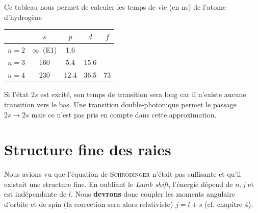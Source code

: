 Ce tableau nous permet de calculer les temps de vie (en ns) de l'atome d'hydrogène
\begin{center}
\begin{tabular}{lcccc}
    & $s$   &   $p$   &   $d$    &  $f$ \\
\hline
$n=2$ & $\infty$~(E1)& 1.6 &   &  \\
$n=3$ & 160  &  5.4  &  15.6 &    \\
$n=4$ & 230  &  12.4 &  36.5 & 73 
\end{tabular}
\end{center}
Si l'état $2s$ est excité, son temps de transition sera long car il n'existe aucune transition vers
le bas. Une transition double-photonique permet le passage $2s\to 2s$ mais ce n'est pas pris en
compte dans cette approximation.


\section{Structure fine des raies}
Nous avions vu que l'équation de \textsc{Schrödinger} n'était pas suffisante et qu'il existait une
structure fine. En oubliant le \textit{Lamb shift}, l'énergie dépend de $n,j$ et est indépendante
de $l$. Nous \textbf{devrons} donc coupler les moments angulaire d'orbite et de spin (la correction
sera alors relativiste) $j=l+s$ (cf. chapitre 4).\\

